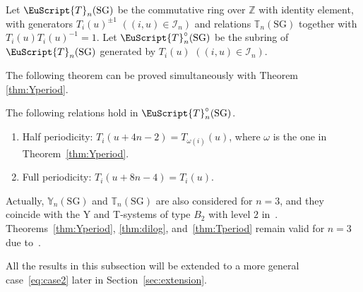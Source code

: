 \begin{Definition}
\label{defn:TC}
Let $\EuScript{T}_{n}(\mathrm{SG})$
be the commutative ring over $\mathbb{Z}$
with identity element,  with gene\-ra\-tors
$T_i(u)^{\pm 1}$ $((i,u)\in \mathcal{I}_{n})$
and relations $\mathbb{T}_{n}(\mathrm{SG})$
together with $T_i(u)T_i(u)^{-1}=1$.
Let $\EuScript{T}^{\circ}_{n}(\mathrm{SG})$
be the subring of $\EuScript{T}_{n}(\mathrm{SG})$
generated by
$T_i(u)$ $((i,u)\in \mathcal{I}_{n})$.
\end{Definition}

The following theorem can be proved simultaneously
with Theorem \ref{thm:Yperiod}.

\begin{Theorem}[Periodicity]
\label{thm:Tperiod}
The following relations hold in $\EuScript{T}^{\circ}_{n}(\mathrm{SG})$.
\begin{enumerate}\itemsep=0pt
\item[$(i)$] Half periodicity: $T_i(u+4n-2)=T_{\omega(i)}(u)$, where
$\omega$ is the  one in Theorem~{\rm \ref{thm:Yperiod}}.
\item[$(ii)$] Full periodicity: $T_i(u+8n-4)=T_i(u)$.
\end{enumerate}
\end{Theorem}

\begin{Remark}
Actually,
 $\mathbb{Y}_n(\mathrm{SG})$ and  $\mathbb{T}_n(\mathrm{SG})$
are also considered for $n=3$,
and they coincide with the Y and T-systems of
type $B_2$ with level $2$ in~\cite{Kuniba94a}.
Theorems~\ref{thm:Yperiod}, \ref{thm:dilog},
and~\ref{thm:Tperiod} remain valid for $n=3$
due to~\cite{Inoue10a}.
\end{Remark}

All the results in this subsection will be
extended to a more general case~\eqref{eq:case2}
later in Section~\ref{sec:extension}.

